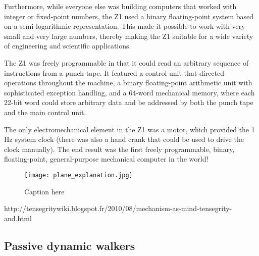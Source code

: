 Furthermore, while everyone else was building computers that worked with integer or fixed-point numbers, the Z1 used a binary floating-point system based on a semi-logarithmic representation. This made it possible to work with very small and very large numbers, thereby making the Z1 suitable for a wide variety of engineering and scientific applications.

The Z1 was freely programmable in that it could read an arbitrary sequence of instructions from a punch tape. It featured a control unit that directed operations throughout the machine, a binary floating-point arithmetic unit with sophisticated exception handling, and a 64-word mechanical memory, where each 22-bit word could store arbitrary data and be addressed by both the punch tape and the main control unit.

The only electromechanical element in the Z1 was a motor, which provided the 1 Hz system clock (there was also a hand crank that could be used to drive the clock manually). The end result was the first freely programmable, binary, floating-point, general-purpose mechanical computer in the world!

\begin{figure}[]
\centering
    \hfil
    \caption{}
    \label{fig:mcgeer_work}
\end{figure}

\begin{figure}[tb]
    \begin{center}
        \texttt{[image: plane\_explanation.jpg]}
    \end{center}
    \caption{Caption here}
    \label{fig:figure1}
\end{figure}

\begin{figure}[]
\centering
    \hfil
    \caption{}
    \label{fig:}
\end{figure}


http://tensegritywiki.blogspot.fr/2010/08/mechanism-as-mind-tensegrity-and.html
\subsection{Passive dynamic walkers} %

